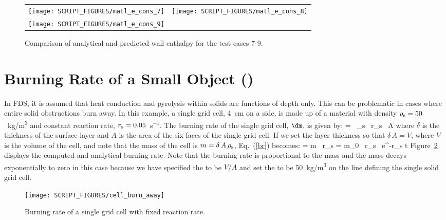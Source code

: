 \documentclass[11pt]{book}
\begin{document}
\begin{figure}[p]
   \noindent
   \begin{tabular*}{\textwidth}{l@{\extracolsep{\fill}}r}
      \texttt{[image: SCRIPT\_FIGURES/matl\_e\_cons\_7]} &
      \texttt{[image: SCRIPT\_FIGURES/matl\_e\_cons\_8]} \\
      \texttt{[image: SCRIPT\_FIGURES/matl\_e\_cons\_9]}
   \end{tabular*}
   \caption[The  test cases 7-9]{Comparison of analytical and predicted wall enthalpy for the  test cases 7-9.}
   \label{fig:matl_e_cons2}
\end{figure}

\section{Burning Rate of a Small Object (\texorpdfstring{}{cell\_burn\_away})}
\label{cell_burn_away}

In FDS, it is assumed that heat conduction and pyrolysis within solids are functions of depth only. This can be problematic in cases where entire solid obstructions burn away. In this example, a single grid cell, 4~cm on a side, is made up of a material with density $\rho_{\rm s}=50$~\si{kg/m^3} and constant reaction rate, $r_{\rm s}=0.05$~s$^{-1}$. The burning rate of the single grid cell, $\dm$, is given by:
\be
   \dm = \delta \, \rho_{\rm s} \, r_{\rm s} \, A  \label{br}
\ee
where $\delta$ is the thickness of the surface layer and $A$ is the area of the six faces of the single grid cell. If we set the layer thickness so that $\delta \, A=V$, where $V$ is the volume of the cell, and note that the mass of the cell is $m=\delta \, A \, \rho_{\rm s}$, Eq.~(\ref{br}) becomes:
\be
   \dm = m \, r_{\rm s} = m_0 \, r_{\rm s} \, {\rm e}^{-r_{\rm s} t}
\ee
Figure~\ref{cell_burn_away_fig} displays the computed and analytical burning rate. Note that the burning rate is proportional to the mass and the mass decays exponentially to zero in this case because we have specified the  to be $V/A$ and set the  to be 50~\si{kg/m^3} on the  line defining the single solid grid cell.
\begin{figure}[!htb]
\centering
\texttt{[image: SCRIPT\_FIGURES/cell\_burn\_away]}
\caption[The  test case]{Burning rate of a single grid cell with fixed reaction rate.}
\label{cell_burn_away_fig}
\end{figure}
\end{document}
